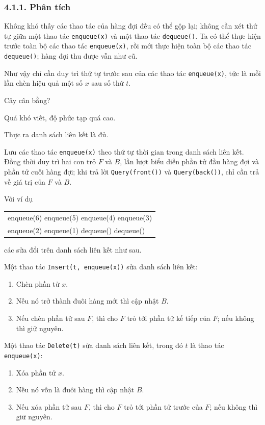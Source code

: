 \documentclass[11pt]{article}
\begin{document}
\subsubsection*{4.1.1. Phân tích}

Không khó thấy các thao tác của hàng đợi đều có thể gộp lại; không cần xét
thứ tự giữa một thao tác \texttt{enqueue(x)} và một thao tác
\texttt{dequeue()}. Ta có thể thực hiện trước toàn bộ các thao tác
\texttt{enqueue(x)}, rồi mới thực hiện toàn bộ các thao tác \texttt{dequeue()};
hàng đợi thu được vẫn như cũ.

Như vậy chỉ cần duy trì thứ tự trước sau của các thao tác \texttt{enqueue(x)},
tức là mỗi lần chèn hiệu quả một số \(x\) sau số thứ \(t\).

Cây cân bằng?

Quá khó viết, độ phức tạp quá cao.

Thực ra danh sách liên kết là đủ.

Lưu các thao tác \texttt{enqueue(x)} theo thứ tự thời gian trong danh sách
liên kết. Đồng thời duy trì hai con trỏ \(F\) và \(B\), lần lượt biểu diễn
phần tử đầu hàng đợi và phần tử cuối hàng đợi; khi trả lời
\texttt{Query(front())} và \texttt{Query(back())}, chỉ cần trả về giá trị của
\(F\) và \(B\).

Với ví dụ
\begin{center}
\ttfamily\small
\begin{tabular}{@{}l@{}}
enqueue(6) enqueue(5) enqueue(4) enqueue(3) \\
enqueue(2) enqueue(1) dequeue() dequeue()
\end{tabular}
\end{center}
các sửa đổi trên danh sách liên kết như sau.

Một thao tác \texttt{Insert(t, enqueue(x))} sửa danh sách liên kết:

\begin{enumerate}
  \item Chèn phần tử \(x\).
  \item Nếu nó trở thành đuôi hàng mới thì cập nhật \(B\).
  \item Nếu chèn phần tử sau \(F\), thì cho \(F\) trỏ tới phần tử kế tiếp của
        \(F\); nếu không thì giữ nguyên.
\end{enumerate}

Một thao tác \texttt{Delete(t)} sửa danh sách liên kết, trong đó \(t\) là thao
tác \texttt{enqueue(x)}:

\begin{enumerate}
  \item Xóa phần tử \(x\).
  \item Nếu nó vốn là đuôi hàng thì cập nhật \(B\).
  \item Nếu xóa phần tử sau \(F\), thì cho \(F\) trỏ tới phần tử trước của
        \(F\); nếu không thì giữ nguyên.
\end{enumerate}
\end{document}
